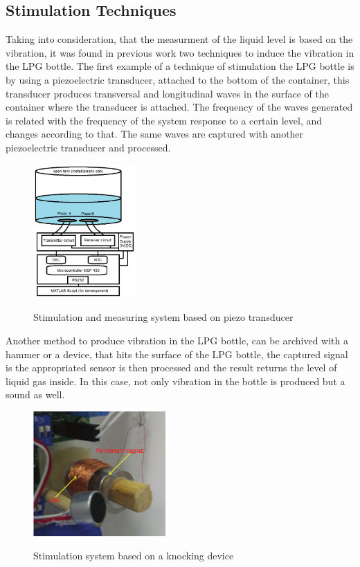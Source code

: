 \subsection{Stimulation Techniques}
Taking into consideration, that the measurment of the liquid level is based on the vibration, it was found in previous work two techniques to induce the vibration in the LPG bottle.
The first example of a technique of stimulation the LPG bottle is by using a piezoelectric transducer, attached to the bottom of the container, this transducer produces transversal and longitudinal waves in the surface of the container where the transducer is attached. The frequency of the waves generated is related with the frequency of the system response to a certain level, and changes according to that. The same waves are captured with another piezoelectric transducer and processed\cite{jahnLevelSensorFluids2014a}.
\begin{figure}[!htb]
    \centering
    \includegraphics[width=0.35\textwidth]{Chapters/2CHP/Diagrams/stimPiezo.eps}
    \caption{Stimulation and measuring system based on piezo transducer}{\cite{jahnLevelSensorFluids2014a}}
    \label{fig:stimPiezo}
\end{figure}
Another method to produce vibration in the LPG bottle, can be archived with a hammer or a device, that hits the surface of the LPG bottle, the captured signal is the appropriated sensor is then processed and the result returns the level of liquid gas inside. In this case, not only vibration in the bottle is produced but a sound as well\cite{wuAnalysisImplementationNoncontact2016a}.
\begin{figure}[!htb]
    \centering
    \includegraphics[width=0.45\textwidth]{Chapters/2CHP/Diagrams/stimHammer.eps}
    \caption{Stimulation system based on a knocking device}{\cite{wuAnalysisImplementationNoncontact2016a}}
    \label{fig:stimHammer}
\end{figure}

